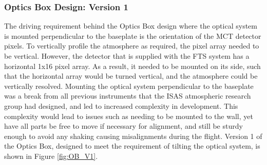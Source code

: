 \subsubsection{Optics Box Design: Version 1}
The driving requirement behind the Optics Box design where the optical system is mounted perpendicular to the baseplate is the orientation of the MCT detector pixels. To vertically profile the atmosphere as required, the pixel array needed to be vertical. However, the detector that is supplied with the FTS system has a horizontal 1x16 pixel array. As a result, it needed to be mounted on its side, such that the horizontal array would be turned vertical, and the atmosphere could be vertically resolved. Mounting the optical system perpendicular to the baseplate was a break from all previous instruments that the ISAS atmospheric research group had designed, and led to increased complexity in development. This complexity would lead to issues such as needing to be mounted to the wall, yet have all parts be free to move if necessary for alignment, and still be sturdy enough to avoid any shaking causing misalignments during the flight. Version 1 of the Optics Box, designed to meet the requirement of tilting the optical system, is shown in Figure \ref{fig:OB_V1}.


